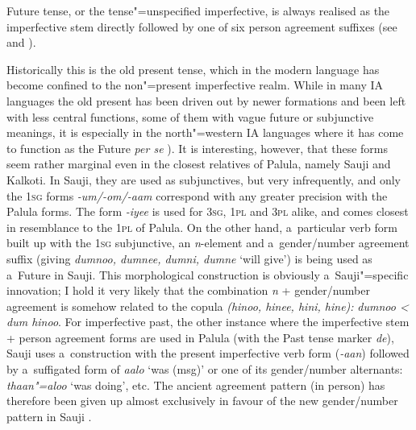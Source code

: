  Future tense, or the tense"=unspecified imperfective, is always realised as the
imperfective stem directly followed by one of six person agreement suffixes (see
 and ).


Historically this is the old present tense, which in the modern language has become confined to the non"=present imperfective realm. While in many IA languages the old present has been driven out by newer formations and been left with less central functions, some of them with vague future or subjunctive meanings, it is especially in the north"=western IA languages where it has come to function as the Future \textit{per se} \citep[288]{masica1991}). It is interesting, however, that these forms seem rather marginal even in the closest relatives of Palula, namely Sauji and Kalkoti. In Sauji, they are used as subjunctives, but very infrequently, and only the \textsc{1sg} forms \textit{-um/-om/-aam} correspond with any greater precision with the Palula forms. The form \textit{-iyee} is used for \textsc{3sg}, \textsc{1pl} and \textsc{3pl} alike, and comes closest in resemblance to the \textsc{1pl} of Palula. On the other hand, a~particular verb form built up with the \textsc{1sg} subjunctive, an \textit{n}-element and a~gender/number agreement suffix (giving \textit{dumnoo, dumnee, dumni, dumne} `will give') is being used as a~Future in Sauji. This morphological construction is obviously a~Sauji"=specific innovation; I hold it very likely that the combination \textit{n} + gender/number agreement is somehow related to the copula \textit{(hinoo, hinee, hini, hine):} \textit{dumnoo {\textless} dum hinoo}. For imperfective past, the other instance where the imperfective stem + person agreement forms are used in Palula (with the Past tense marker \textit{de}), Sauji uses a~construction with the present imperfective verb form (\textit{-aan}) followed by a~suffigated form of \textit{aalo} `was (msg)' or one of its gender/number alternants: \textit{thaan"=aloo} `was doing', etc. The ancient agreement pattern (in person) has therefore been given up almost exclusively in favour of the new gender/number pattern in Sauji \citep[46--54]{buddruss1967}.



